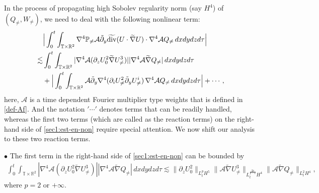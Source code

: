 \documentclass[11pt,reqno]{article}
\numberwithin{equation}{section}
\newcommand\R{{\mathbb R}}
\newcommand\T{{\mathbb T}}
\newcommand\PP{{\mathbb P}}
\newcommand\A{\mathcal{A}}
\let\pa=\partial
\let\f=\frac
\def\dive{\mathop{\rm div}\nolimits}
\begin{document}
In  the process of propagating high Sobolev regularity norm (say $H^4$) of $(Q_{\neq}, W_{\neq})$, we need to deal with the following nonlinear term:
\begin{align} 
	&\Big|\int_0^t\int_{\T\times\R^2}	
    \nabla^4\PP_{\not=}\A\tilde{\pa}_y\widetilde{\dive}(U\cdot\widetilde{\nabla} U)
    \cdot
    \nabla^4\A Q_{\not=}\,dxdydz d\tau \Big|
	\nonumber\\
	\lesssim& \int_0^t\int_{\T\times\R^2}	|\nabla^4\A(\pa_z U_{0}^2\widetilde{\nabla}U_{\not=}^3)| |\nabla^4\A\widetilde{\nabla}Q_{\not=}|\,dxdydz d\tau
    \nonumber\\
    &
    +\Big|\int_0^t\int_{\T\times\R^2} \A\tilde{\pa}_y\nabla^4(\pa_{i}U_{\not=}^2\tilde{\pa}_yU_{\not=}^i)\, \nabla^4\A Q_{\not=}\,dxdydzd\tau \Big|
    +\cdots,
    \label{sec1:est-en-non}
\end{align}
here, $\A$ is a time dependent Fourier multiplier type weights that is defined in \eqref{def-Af}. And the notation $'\cdots'$ denotes terms that can be readily handled, whereas the first two terms (which are called as the reaction terms) on the right-hand side of \eqref{sec1:est-en-non} require special attention.
We now shift our analysis to these two reaction terms.

$\bullet$ The first term in the right-hand side of \eqref{sec1:est-en-non} can be bounded by
\begin{align} 
	\int_0^t\int_{\T\times\R^2}	|\nabla^4\A(\pa_z U_{0}^2\widetilde{\nabla}U_{\not=}^3)| |\nabla^4\A\widetilde{\nabla}Q_{\not=}|\,dxdydz d\tau
	\lesssim 	\|\pa_{z}U_{0}^2 \|_{L^p_tH^5}  \|\A \widetilde{\nabla}U_{\not=}^3\|_{L^{\f{2p}{p-2}}_tH^4} \|\A\widetilde{\nabla}Q_{\not=}\|_{L^2_tH^4},
	\label{intro-1}
\end{align}
where $p=2$ or $+\infty$.  %
\end{document}
